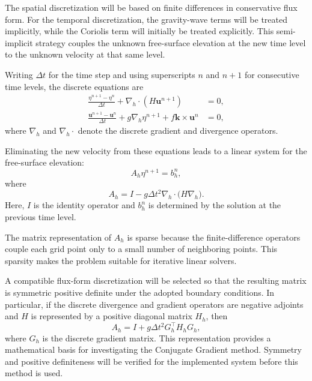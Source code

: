 The spatial discretization will be based on finite differences
in conservative flux form. For the temporal discretization, the
gravity-wave terms will be treated implicitly, while the Coriolis
term will initially be treated explicitly. This semi-implicit
strategy couples the unknown free-surface elevation at the new
time level to the unknown velocity at that same level.

Writing $\Delta t$ for the time step and using superscripts
$n$ and $n+1$ for consecutive time levels, the discrete equations
are
\begin{align}
    \frac{\eta^{n+1}-\eta^n}{\Delta t}
    + \nabla_h\cdot(H\mathbf{u}^{n+1}) & = 0,
    \label{eq:discrete_continuity}
    \\
    \frac{\mathbf{u}^{n+1}-\mathbf{u}^n}{\Delta t}
    + g\nabla_h\eta^{n+1}
    + f\mathbf{k}\times\mathbf{u}^{n}  & = 0,
    \label{eq:discrete_momentum}
\end{align}
where $\nabla_h$ and $\nabla_h\cdot$ denote the discrete gradient
and divergence operators.

Eliminating the new velocity from these equations leads to a
linear system for the free-surface elevation:
\begin{equation}
    A_h\eta^{n+1}=b_h^n,
    \label{eq:linear_system}
\end{equation}
where
\begin{equation}
    A_h =
    I-g\Delta t^2
    \nabla_h\cdot\bigl(H\nabla_h\bigr).
    \label{eq:discrete_operator}
\end{equation}
Here, $I$ is the identity operator and $b_h^n$ is determined by
the solution at the previous time level.

The matrix representation of $A_h$ is sparse because the
finite-difference operators couple each grid point only to a
small number of neighboring points. This sparsity makes the
problem suitable for iterative linear solvers.

A compatible flux-form discretization will be selected so that
the resulting matrix is symmetric positive definite under the
adopted boundary conditions. In particular, if the discrete
divergence and gradient operators are negative adjoints and
$H$ is represented by a positive diagonal matrix $H_h$, then
\begin{equation}
    A_h =
    I+g\Delta t^2 G_h^\top H_hG_h,
    \label{eq:spd_operator}
\end{equation}
where $G_h$ is the discrete gradient matrix. This representation
provides a mathematical basis for investigating the Conjugate
Gradient method. Symmetry and positive definiteness will be
verified for the implemented system before this method is used.


